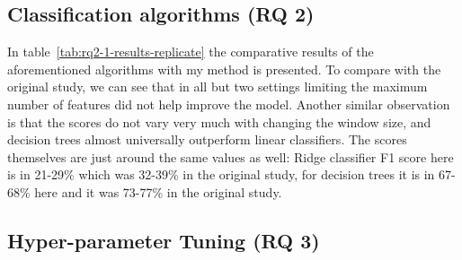\subsection{Classification algorithms (RQ 2)}
In table~\ref{tab:rq2-1-results-replicate} the comparative results of the aforementioned algorithms with my method is presented. 
To compare with the original study, we can see that in all but two settings limiting the maximum number of features did not help improve the model. Another similar observation is that the scores do not vary very much with changing the window size, and decision trees almost universally outperform linear classifiers.
The scores themselves are just around the same values as well: Ridge classifier F1 score here is in 21-29\% which was 32-39\% in the original study, for decision trees it is in 67-68\% here and it was 73-77\% in the original study. 


\begin{table}
\caption{Precision, recall, and F1 score of ridge classifiers (linear classifiers with L2 regularization) and decision tree classifiers with different sliding window widths ($w$). In this table, we only show the results of the best performing model in each group.}
\label{tab:rq2-1-results-replicate}
\end{table}
\subsection{Hyper-parameter Tuning (RQ 3)}
